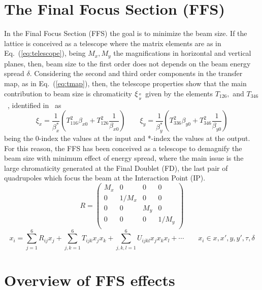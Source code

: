 \section{The Final Focus Section (FFS)}
In the Final Focus Section (FFS) the goal is to minimize the beam size. If the lattice is conceived as a telescope where the matrix elements are as in Eq.~(\ref{eq:telescope}), being $M_x, M_y$ the magnifications in horizontal and vertical planes, then, beam size to the first order does not depends on the beam energy spread $\delta$. Considering the second and third order components in the transfer map, as in Eq.~(\ref{eq:tmap}), then, the telescope properties show that the main contribution to beam size is chromaticity $\xi_{x\atop y}$ given by the elements $T_{126},$ and $T_{346}$~\cite{Brown:1987}, identified in~\cite{GarciaMorales:1982827} as
\begin{equation}
 \xi_x = \frac{1}{\beta_x^*}\left(T_{116}^2\beta_{x0}+T_{126}^2\frac{1}{\beta_{x0}}\right)\qquad
 \xi_y = \frac{1}{\beta_y^*}\left(T_{336}^2\beta_{y0}+T_{346}^2\frac{1}{\beta_{y0}}\right)
\end{equation}
being the 0-index the values at the input and *-index the values at the output. For this reason, the FFS has been conceived as a telescope to demagnify the beam size with minimum effect of energy spread, where the main issue is the large chromaticity generated at the Final Doublet (FD), the last pair of quadrupoles which focus the beam at the Interaction Point (IP).
\begin{equation}
R=
 \begin{pmatrix}
   M_x & 0 & 0 & 0 \\
   0 & 1/M_x & 0 & 0 \\
   0 & 0 & M_y & 0 \\
   0 & 0 & 0 & 1/M_y \\
  \end{pmatrix}\label{eq:telescope}
\end{equation}
\begin{equation}
x_i=\sum_{j=1}^6R_{ij}x_j+\sum_{j,k=1}^6T_{ijk}x_jx_k+\sum_{j,k,l=1}^6U_{ijkl}x_jx_kx_l+\cdots\qquad x_i\in x,x',y,y',\tau,\delta\label{eq:tmap}
\end{equation}
\section{Overview of FFS effects}
